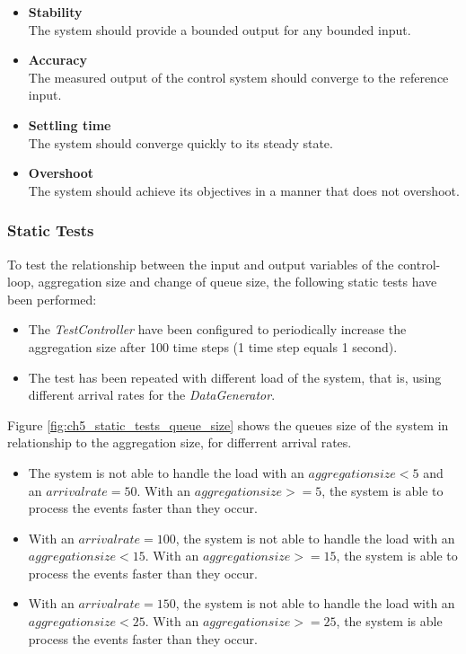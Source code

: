 \begin{itemize}
	\item \textbf{Stability}\\
	The system should provide a bounded output for any bounded input.
	\item \textbf{Accuracy}\\
	The measured output of the control system should converge to the reference input.
	\item \textbf{Settling time}\\
	The system should converge quickly to its steady state.
	\item \textbf{Overshoot}\\
	The system should achieve its objectives in a manner that does not overshoot.
\end{itemize}

\subsubsection{Static Tests}
\label{sec:ch05_static_tests}
To test the relationship between the input and output variables of the control-loop, aggregation size and change of queue size, the following static tests have been performed:
\begin{itemize}
	\item The \emph{TestController} have been configured to periodically increase the aggregation size after 100 time steps (1 time step equals 1 second).
	\item The test has been repeated with different load of the system, that is, using different arrival rates for the \emph{DataGenerator}.
\end{itemize}

Figure \ref{fig:ch5_static_tests_queue_size} shows the queues size of the system in relationship to the aggregation size, for differrent arrival rates. 

\begin{itemize}
	\item The system is not able to handle the load with an $aggregation size < 5$ and an $arrival rate = 50$. With an $aggregation size >= 5$, the system is able to process the events faster than they occur.
	\item With an $arrival rate = 100$, the system is not able to handle the load with an $aggregation size < 15$. With an $aggregation size >= 15$, the system is able to process the events faster than they occur.
	\item With an $arrival rate = 150$, the system is not able to handle the load with an $aggregation size < 25$. With an $aggregation size >= 25$, the system is able process the events faster than they occur.
\end{itemize}

